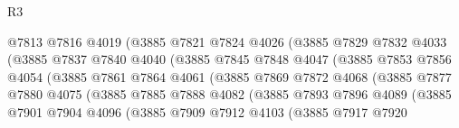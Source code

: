\begin{lexlean}{R3}
\begin{coremodule}
                              @7813
                              @7816
                              @4019
                              (@3885
                                @7821
                                @7824
                                @4026
                                (@3885
                                  @7829
                                  @7832
                                  @4033
                                  (@3885
                                    @7837
                                    @7840
                                    @4040
                                    (@3885
                                      @7845
                                      @7848
                                      @4047
                                      (@3885
                                        @7853
                                        @7856
                                        @4054
                                        (@3885
                                          @7861
                                          @7864
                                          @4061
                                          (@3885
                                            @7869
                                            @7872
                                            @4068
                                            (@3885
                                              @7877
                                              @7880
                                              @4075
                                              (@3885
                                                @7885
                                                @7888
                                                @4082
                                                (@3885
                                                  @7893
                                                  @7896
                                                  @4089
                                                  (@3885
                                                    @7901
                                                    @7904
                                                    @4096
                                                    (@3885
                                                      @7909
                                                      @7912
                                                      @4103
                                                      (@3885
                                                        @7917
                                                        @7920

\end{coremodule}
\end{lexlean}
